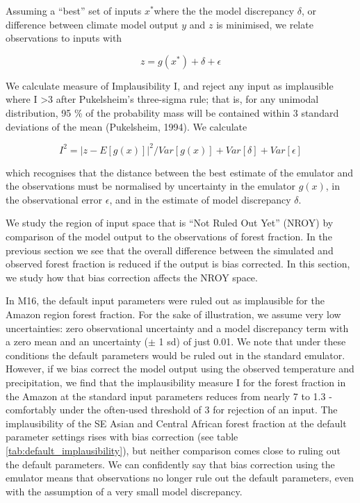 \documentclass[gmd, manuscript]{copernicus}
\begin{document}
Assuming a ``best'' set of inputs $x^*$where the the model discrepancy $\delta$, or difference between climate model output $y$ and $z$ is minimised, we relate observations to inputs with 

\begin{equation}
z = g(x^*) + \delta + \epsilon 
\end{equation}

We calculate measure of Implausibility I, and reject any input as implausible where I >3 after Pukelsheim's three-sigma rule; that is, for any unimodal distribution, 95 \% of the probability mass will be contained within 3 standard deviations of the mean (Pukelsheim, 1994). We calculate

\begin{equation}
I^{2} = {\lvert  z - E[g(x)]\rvert}^{2} /  Var[g(x)] + Var[\delta] +  Var[\epsilon]
\end{equation}

which recognises that the distance between the best estimate of the emulator and the observations must be normalised by uncertainty in the emulator $g(x)$, in the observational error $\epsilon$, and in the estimate of model discrepancy $\delta$. 

We study the region of input space that is ``Not Ruled Out Yet'' (NROY) by comparison of the model output to the observations of forest fraction. In the previous section we see that the overall difference between the simulated and observed forest fraction is reduced if the output is bias corrected. In this section, we study how that bias correction affects the NROY space.

In M16, the default input parameters were ruled out as implausible for the Amazon region forest fraction. For the sake of illustration, we assume very low uncertainties: zero observational uncertainty and a model discrepancy term with a zero mean and an uncertainty ($\pm$ 1 sd) of just 0.01. We note that under these conditions the default parameters would be ruled out in the standard emulator.  However, if we bias correct the model output using the observed temperature and precipitation, we find that the implausibility measure I for the forest fraction in the Amazon at the standard input parameters reduces from nearly 7 to 1.3 - comfortably under the often-used threshold of 3 for rejection of an input. The implausibility of the SE Asian and Central African forest fraction at the default parameter settings rises with bias correction (see table \ref{tab:default_implausibility}), but neither comparison comes close to ruling out the default parameters. We can confidently say that bias correction using the emulator means that observations no longer rule out the default parameters, even with the assumption of a very small model discrepancy.
\end{document}
